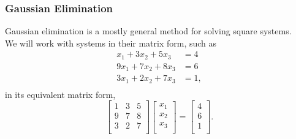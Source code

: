 \documentclass[10pt]{beamer}
\begin{document}
\begin{frame}
\frametitle{Gaussian Elimination}
Gaussian elimination is a mostly general method for solving square systems.\\
\vspace{0.5cm}
We will work with systems in their matrix form, such as
\begin{align*}
      x_1 + 3x_2 + 5x_3 &= 4\\
     9x_1 + 7x_2 + 8x_3 &= 6\\
     3x_1 + 2x_2 + 7x_3 &= 1,\\
\end{align*}
in its equivalent matrix form,
\begin{equation*}
    \begin{bmatrix} 1 & 3 & 5 \\
                    9 & 7 & 8 \\
                    3 & 2 & 7 \\
    \end{bmatrix}
    \begin{bmatrix} x_1 \\
                    x_2 \\
                    x_3 \\
    \end{bmatrix} =
    \begin{bmatrix} 4 \\
                    6 \\
                    1 \\
    \end{bmatrix}.
\end{equation*}
\end{frame}
\end{document}
